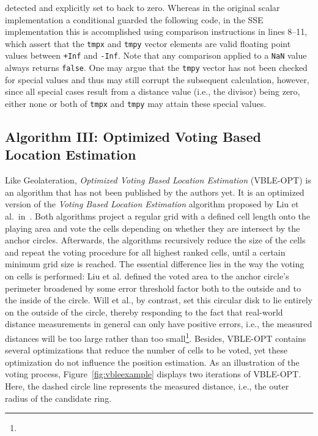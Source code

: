 detected and explicitly set to back to zero. Whereas in the original scalar implementation a conditional guarded the following code, in the SSE implementation this is accomplished using comparison instructions in lines 8--11, which assert that the \texttt{tmpx} and \texttt{tmpy} vector elements are valid floating point values between \texttt{+Inf} and \texttt{-Inf}. Note that any comparison applied to a \texttt{NaN} value always returns \texttt{false}. One may argue that the \texttt{tmpy} vector has not been checked for special values and thus may still corrupt the subsequent calculation, however, since all special cases result from a distance value (i.e., the divisor) being zero, either none or both of \texttt{tmpx} and \texttt{tmpy} may attain these special values.


\subsection{Algorithm III: Optimized Voting Based Location Estimation}
Like Geolateration, \emph{Optimized Voting Based Location Estimation} (VBLE-OPT) is an algorithm that has not been published by the authors yet. It is an optimized version of the \emph{Voting Based Location Estimation} algorithm proposed by Liu et al.\ in~\cite{liu2005attackresistant}. Both algorithms project a regular grid with a defined cell length onto the playing area and vote the cells depending on whether they are intersect by the anchor circles. Afterwards, the algorithms recursively reduce the size of the cells and repeat the voting procedure for all highest ranked cells, until a certain minimum grid size is reached. The essential difference lies in the way the voting on cells is performed: Liu et al. defined the voted area to the anchor circle's perimeter broadened by some error threshold factor both to the outside and to the inside of the circle. Will et al., by contrast, set this circular disk to lie entirely on the outside of the circle, thereby responding to the fact that real-world distance measurements in general can only have positive errors, i.e., the measured distances will be too large rather than too small\footnote{}. Besides, VBLE-OPT contains several optimizations that reduce the number of cells to be voted, yet these optimization do not influence the position estimation. As an illustration of the voting process, Figure~\ref{fig:vbleexample} displays two iterations of VBLE-OPT. Here, the dashed circle line represents the measured distance, i.e., the outer radius of the candidate ring. 

